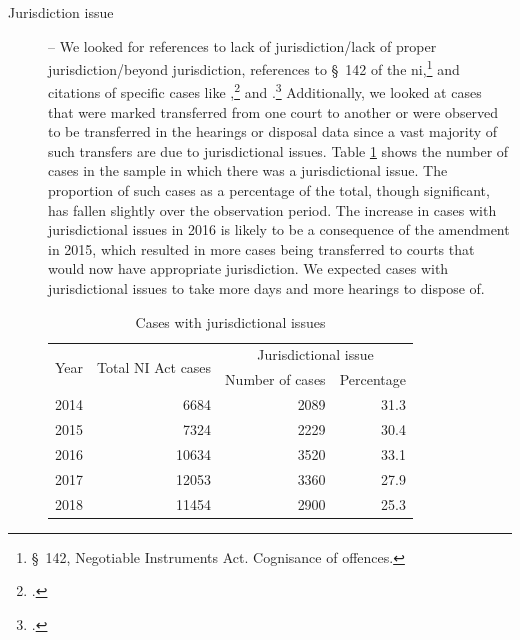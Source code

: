 \documentclass[12pt,a4paper]{article}
\begin{document}
\begin{description}
\item [Jurisdiction issue] -- We looked for references to lack of jurisdiction/lack of proper jurisdiction/beyond jurisdiction, references to \S~142 of the \gls{ni},\footnote{\S~142, Negotiable Instruments Act. Cognisance of offences.} and citations of specific cases like ,\footcite{sc2014_dhanuka} and .\footcite{sc2016_carbon} Additionally, we looked at cases that were marked transferred from one court to another or were observed to be transferred in the hearings or disposal data since a vast majority of such transfers are due to jurisdictional issues. Table \ref{tab:jurisdiction_yearWise} shows the number of cases in the sample in which there was a jurisdictional issue. The proportion of such cases as a percentage of the total, though significant, has fallen slightly over the observation period. The increase in cases with jurisdictional issues in 2016 is likely to be a consequence of the amendment in 2015, which resulted in more cases being transferred to courts that would now have appropriate jurisdiction. We expected cases with jurisdictional issues to take more days and more hearings to dispose of.

\begin{table}[!ht]
\caption{Cases with jurisdictional issues}\label{tab:jurisdiction_yearWise}
\centering
\footnotesize
\begin{tabular}{@{}lrrr@{}}
\toprule
\multirow{2}{*}{Year} & \multirow{2}{*}{Total NI Act cases} & \multicolumn{2}{c}{Jurisdictional issue}\\
\cmidrule{3-4}
&& Number of cases & Percentage \\
\midrule %
2014 & 6684 & 2089 & 31.3 \\
2015 & 7324 & 2229 & 30.4 \\
2016 & 10634 & 3520 & 33.1 \\
2017 & 12053 & 3360 & 27.9 \\
2018 & 11454 & 2900 & 25.3 \\
\bottomrule
\end{tabular}
\end{table}

\item[]


\end{description}
\end{document}

